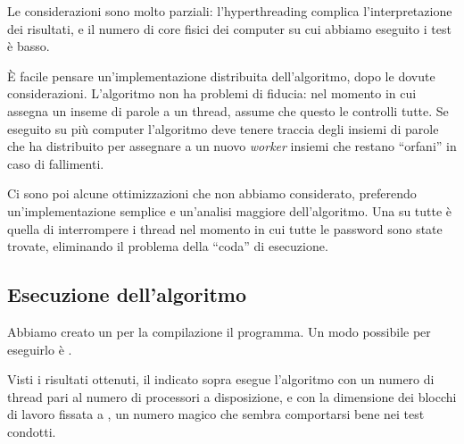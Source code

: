 \documentclass[]{myarticle}
\begin{document}
Le considerazioni sono molto parziali: l'hyperthreading complica l'interpretazione dei risultati, e il numero di core fisici dei computer su cui abbiamo eseguito i test \`e basso.

\`E facile pensare un'implementazione distribuita dell'algoritmo, dopo le dovute considerazioni.
L'algoritmo non ha problemi di fiducia: nel momento in cui assegna un inseme di parole a un thread, assume che questo le controlli tutte.
Se eseguito su pi\`u computer l'algoritmo deve tenere traccia degli insiemi di parole che ha distribuito per assegnare a un nuovo \emph{worker} insiemi che restano ``orfani'' in caso di fallimenti.

Ci sono poi alcune ottimizzazioni che non abbiamo considerato, preferendo un'implementazione semplice e un'analisi maggiore dell'algoritmo.
Una su tutte \`e quella di interrompere i thread nel momento in cui tutte le password sono state trovate, eliminando il problema della ``coda'' di esecuzione.

\subsection{Esecuzione dell'algoritmo}

Abbiamo creato un  per la compilazione il programma.
Un modo possibile per eseguirlo \`e .

Visti i risultati ottenuti, il  indicato sopra esegue l'algoritmo con un numero di thread pari al numero di processori a disposizione, e con la dimensione dei blocchi di lavoro fissata a , un numero magico che sembra comportarsi bene nei test condotti.

\renewcommand{\refname}{Riferimenti}

\printbibliography
\end{document}
